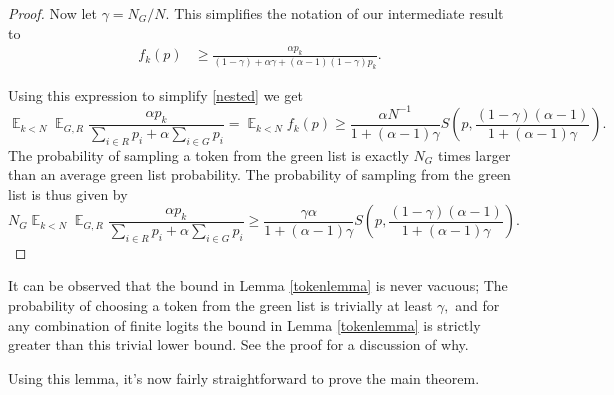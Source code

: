 \documentclass{article}
\theoremstyle{plain}
\theoremstyle{definition}
\theoremstyle{remark}
\DeclareMathOperator*{\expect}{\mathbb{E}}
\begin{document}
\begin{proof}
Now let $\gamma = N_G/N.$  This simplifies the notation of our intermediate result to
\begin{align}
f_k(p) &\ge \frac{\alpha p_k }{ (1-\gamma) +\alpha \gamma +  (\alpha - 1)(1-\gamma) p_k  }.
\end{align}

Using this expression to simplify \eqref{nested} we get
  $$\expect_{k < N} \expect_{G, R}  \frac{\alpha p_k}{\sum_{i\in R} p_i + \alpha \sum_{i\in G} p_i } = \expect_{k < N} f_k(p) 
  \ge \frac{\alpha N^{-1}}{  1+(\alpha-1)\gamma } S\left(p,\frac{(1-\gamma)(\alpha - 1)}{ 1+(\alpha-1)\gamma}\right).$$
The probability of sampling a token from the green list is exactly $N_G$ times larger than an average green list probability. The probability of sampling from the green list is thus given by
$$N_G \expect_{k < N} \expect_{G, R}  \frac{\alpha p_k}{\sum_{i\in R} p_i + \alpha \sum_{i\in G} p_i } 
\ge \frac{\gamma\alpha}{ 1+(\alpha-1)\gamma} S\left(p,\frac{(1-\gamma)(\alpha - 1)}{ 1+(\alpha-1)\gamma}\right).$$

  \end{proof}

It can be observed that the bound in Lemma \ref{tokenlemma} is never vacuous;  The probability of choosing a token from the green list is trivially at least $\gamma,$  and for any combination of finite logits the bound in Lemma \ref{tokenlemma} is strictly greater than this trivial lower bound. See the proof for a discussion of why.


Using this lemma, it's now fairly straightforward to prove the main theorem.
\end{document}
